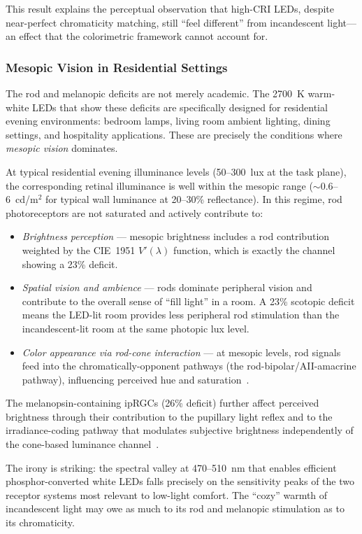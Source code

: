 \documentclass[11pt]{article}
\begin{document}
This result explains the perceptual observation that high-CRI LEDs,
despite near-perfect chromaticity matching, still ``feel different''
from incandescent light---an effect that the colorimetric framework
cannot account for.

\subsubsection{Mesopic Vision in Residential Settings}

The rod and melanopic deficits are not merely academic.  The 2700~K
warm-white LEDs that show these deficits are specifically designed for
residential evening environments: bedroom lamps, living room ambient
lighting, dining settings, and hospitality applications.  These are
precisely the conditions where \emph{mesopic vision} dominates.

At typical residential evening illuminance levels (50--300~lux at the
task plane), the corresponding retinal illuminance is well within the
mesopic range ($\sim$0.6--6~cd/m$^2$ for typical wall luminance at
20--30\% reflectance).  In this regime, rod photoreceptors are not
saturated and actively contribute to:
\begin{itemize}
\item \emph{Brightness perception} --- mesopic brightness includes a
  rod contribution weighted by the CIE~1951 $V'(\lambda)$ function,
  which is exactly the channel showing a 23\% deficit.
\item \emph{Spatial vision and ambience} --- rods dominate peripheral
  vision and contribute to the overall sense of ``fill light'' in a
  room.  A 23\% scotopic deficit means the LED-lit room provides
  less peripheral rod stimulation than the incandescent-lit room at
  the same photopic lux level.
\item \emph{Color appearance via rod-cone interaction} --- at mesopic
  levels, rod signals feed into the chromatically-opponent pathways
  (the rod-bipolar/AII-amacrine pathway), influencing perceived hue
  and saturation~\cite{buck2004}.
\end{itemize}

The melanopsin-containing ipRGCs (26\% deficit) further affect
perceived brightness through their contribution to the pupillary
light reflex and to the irradiance-coding pathway that modulates
subjective brightness independently of the cone-based luminance
channel~\cite{brown2012}.

The irony is striking: the spectral valley at 470--510~nm that
enables efficient phosphor-converted white LEDs falls precisely on
the sensitivity peaks of the two receptor systems most relevant to
low-light comfort.  The ``cozy'' warmth of incandescent light may
owe as much to its rod and melanopic stimulation as to its chromaticity.
\end{document}
